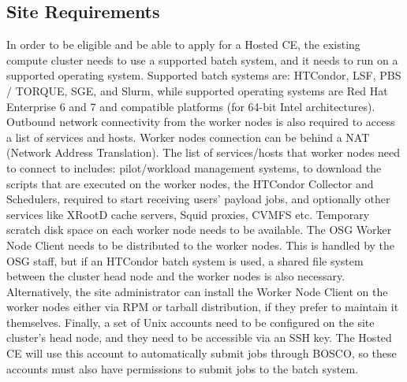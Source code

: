 \documentclass{webofc}
\begin{document}



\subsection{Site Requirements}
\label{requirements}
In order to be eligible and be able to apply for a Hosted CE, the existing compute cluster needs to use a supported batch system, and it needs to run on a supported operating system. Supported batch systems are: HTCondor, LSF, PBS / TORQUE, SGE, and Slurm, while supported operating systems are Red Hat Enterprise 6 and 7 and compatible platforms (for 64-bit Intel architectures). Outbound network connectivity from the worker nodes is also required to access a list of services and hosts. Worker nodes connection can be behind a NAT (Network Address Translation). The list of services/hosts that worker nodes need to connect to includes: pilot/workload management systems, to download the scripts that are executed on the worker nodes, the HTCondor Collector and Schedulers\cite{HTCondor}, required to start receiving users' payload jobs, and optionally other services like XRootD cache servers\cite{AAA}, Squid proxies\cite{frontier}, CVMFS\cite{CVMFS} etc. Temporary scratch disk space on each worker node needs to be available. The OSG Worker Node Client needs to be distributed to the worker nodes. This is handled by the OSG staff, but if an HTCondor batch system is used, a shared file system between the cluster head node and the worker nodes is also necessary. Alternatively, the site administrator can install the Worker Node Client on the worker nodes either via RPM or tarball distribution, if they prefer to maintain it themselves. Finally, a set of Unix accounts need to be configured on the site cluster's head node, and they need to be accessible via an SSH key. The Hosted CE will use this account to automatically submit jobs through BOSCO\cite{Weitzel2014}, so these accounts must also have permissions to submit jobs to the batch system.
\end{document}
